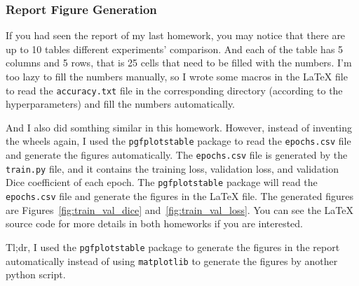 \subsubsection{Report Figure Generation}

If you had seen the report of my last homework, you may notice that there are up to 10 tables different experiments' comparison.
And each of the table has 5 columns and 5 rows, that is 25 cells that need to be filled with the numbers.
I'm too lazy to fill the numbers manually, so I wrote some macros in the \LaTeX{} file to read the \texttt{accuracy.txt} file in the corresponding directory (according to the hyperparameters) and fill the numbers automatically.

And I also did somthing similar in this homework.
However, instead of inventing the wheels again, I used the \texttt{pgfplotstable} package to read the \texttt{epochs.csv} file and generate the figures automatically.
The \texttt{epochs.csv} file is generated by the \texttt{train.py} file, and it contains the training loss, validation loss, and validation Dice coefficient of each epoch.
The \texttt{pgfplotstable} package will read the \texttt{epochs.csv} file and generate the figures in the \LaTeX{} file.
The generated figures are Figures~\ref{fig:train_val_dice} and~\ref{fig:train_val_loss}.
You can see the \LaTeX{} source code for more details in both homeworks if you are interested.

Tl;dr, I used the \texttt{pgfplotstable} package to generate the figures in the report automatically instead of using \texttt{matplotlib} to generate the figures by another python script.
